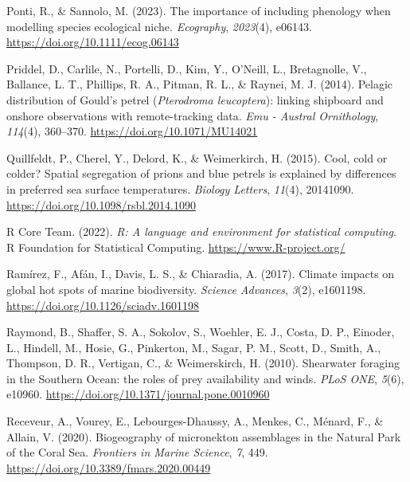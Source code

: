 \documentclass{article}
\newlength{\cslhangindent}
\newlength{\cslentryspacingunit} %
\newenvironment{CSLReferences}[2] %
 {%
  \setlength{\parindent}{0pt}
  \ifodd #1
  \let\oldpar\par
  \def\par{\hangindent=\cslhangindent\oldpar}
  \fi
  \setlength{\parskip}{#2\cslentryspacingunit}
 }%
 {}
\begin{document}
\begin{linenumbers}
\begin{CSLReferences}{1}{0}
\leavevmode{}%
Ponti, R., \& Sannolo, M. (2023). The importance of including phenology when modelling species ecological niche. \emph{Ecography}, \emph{2023}(4), e06143. \url{https://doi.org/10.1111/ecog.06143}

\leavevmode{}%
Priddel, D., Carlile, N., Portelli, D., Kim, Y., O'Neill, L., Bretagnolle, V., Ballance, L. T., Phillips, R. A., Pitman, R. L., \& Raynei, M. J. (2014). Pelagic distribution of Gould's petrel ({\emph{Pterodroma leucoptera}}): linking shipboard and onshore observations with remote-tracking data. \emph{Emu - Austral Ornithology}, \emph{114}(4), 360--370. \url{https://doi.org/10.1071/MU14021}

\leavevmode{}%
Quillfeldt, P., Cherel, Y., Delord, K., \& Weimerkirch, H. (2015). Cool, cold or colder? Spatial segregation of prions and blue petrels is explained by differences in preferred sea surface temperatures. \emph{Biology Letters}, \emph{11}(4), 20141090. \url{https://doi.org/10.1098/rsbl.2014.1090}

\leavevmode{}%
R Core Team. (2022). \emph{R: A language and environment for statistical computing}. R Foundation for Statistical Computing. \url{https://www.R-project.org/}

\leavevmode{}%
Ramírez, F., Afán, I., Davis, L. S., \& Chiaradia, A. (2017). Climate impacts on global hot spots of marine biodiversity. \emph{Science Advances}, \emph{3}(2), e1601198. \url{https://doi.org/10.1126/sciadv.1601198}

\leavevmode{}%
Raymond, B., Shaffer, S. A., Sokolov, S., Woehler, E. J., Costa, D. P., Einoder, L., Hindell, M., Hosie, G., Pinkerton, M., Sagar, P. M., Scott, D., Smith, A., Thompson, D. R., Vertigan, C., \& Weimerskirch, H. (2010). Shearwater foraging in the Southern Ocean: the roles of prey availability and winds. \emph{PLoS ONE}, \emph{5}(6), e10960. \url{https://doi.org/10.1371/journal.pone.0010960}

\leavevmode{}%
Receveur, A., Vourey, E., Lebourges-Dhaussy, A., Menkes, C., Ménard, F., \& Allain, V. (2020). Biogeography of micronekton assemblages in the Natural Park of the Coral Sea. \emph{Frontiers in Marine Science}, \emph{7}, 449. \url{https://doi.org/10.3389/fmars.2020.00449}


\end{CSLReferences}
\end{linenumbers}
\end{document}
